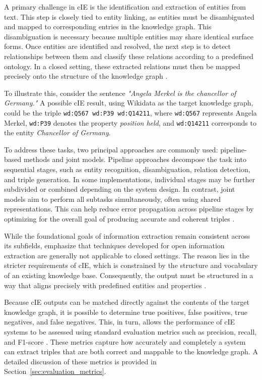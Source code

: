 \documentclass[a4paper,oneside,bibliography=totoc]{scrbook}
\begin{document}
A primary challenge in \ac{cIE} is the identification and extraction of entities from text. This step is closely tied to entity linking, as entities must be disambiguated and mapped to corresponding entries in the knowledge graph. This disambiguation is necessary because multiple entities may share identical surface forms. Once entities are identified and resolved, the next step is to detect relationships between them and classify these relations according to a predefined ontology. In a closed setting, these extracted relations must then be mapped precisely onto the structure of the knowledge graph \cite{Josifoski2021,Zhao2024}.

To illustrate this, consider the sentence \textit{"Angela Merkel is the chancellor of Germany."} A possible \ac{cIE} result, using Wikidata as the target knowledge graph, could be the triple \texttt{wd:Q567\ wd:P39\ wd:Q14211}, where \texttt{wd:Q567} represents Angela Merkel, \texttt{wd:P39} denotes the property \textit{position held}, and \texttt{wd:Q14211} corresponds to the entity \textit{Chancellor of Germany}.

To address these tasks, two principal approaches are commonly used: pipeline-based methods and joint models. Pipeline approaches decompose the task into sequential stages, such as entity recognition, disambiguation, relation detection, and triple generation. In some implementations, individual stages may be further subdivided or combined depending on the system design. In contrast, joint models aim to perform all subtasks simultaneously, often using shared representations. This can help reduce error propagation across pipeline stages by optimizing for the overall goal of producing accurate and coherent triples \cite{Zhao2024,Josifoski2021}.

While the foundational goals of information extraction remain consistent across its subfields, \citet{Josifoski2021} emphasize that techniques developed for open information extraction are generally not applicable to closed settings. The reason lies in the stricter requirements of \ac{cIE}, which is constrained by the structure and vocabulary of an existing knowledge base. Consequently, the output must be structured in a way that aligns precisely with predefined entities and properties \cite{Josifoski2021}.

Because \ac{cIE} outputs can be matched directly against the contents of the target knowledge graph, it is possible to determine true positives, false positives, true negatives, and false negatives. This, in turn, allows the performance of \ac{cIE} systems to be assessed using standard evaluation metrics such as precision, recall, and F1-score \cite{Josifoski2021,Josifoski2023}. These metrics capture how accurately and completely a system can extract triples that are both correct and mappable to the knowledge graph. A detailed discussion of these metrics is provided in Section~\ref{sec:evaluation_metrics}.
\end{document}
